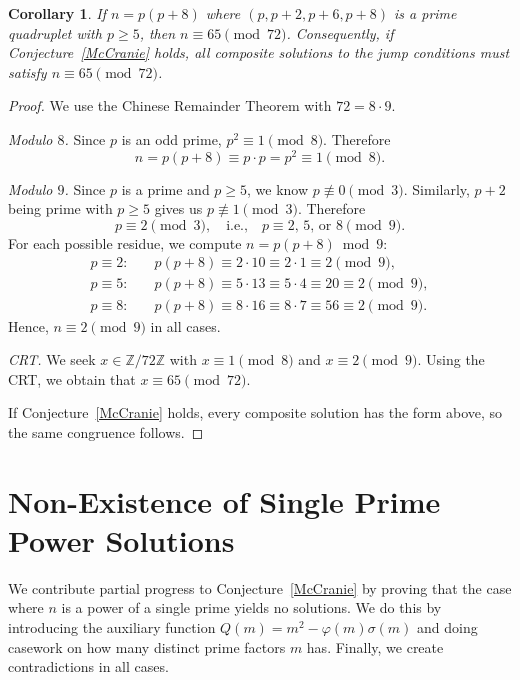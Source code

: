 \documentclass[12pt, twoside]{amsart}
\newtheorem{corollary}[theorem]{Corollary}
\theoremstyle{definition}
\begin{document}
\begin{corollary}\label{cor:residue} If $n = p(p+8)$ where $(p, p+2, p+6, p+8)$ is a prime quadruplet with $p \ge 5$, then $n \equiv 65 \pmod{72}$. Consequently, if Conjecture~\ref{McCranie} holds, all composite solutions to the jump conditions must satisfy $n \equiv 65 \pmod{72}$.
\end{corollary}

\begin{proof}
We use the Chinese Remainder Theorem with $72 = 8 \cdot 9$.

\emph{Modulo $8$.} Since $p$ is an odd prime, $p^2 \equiv 1 \pmod 8$. Therefore
\[
n = p(p+8) \equiv p \cdot p = p^2 \equiv 1 \pmod 8.
\]

\emph{Modulo $9$.} Since $p$ is a prime and $p\ge5$, we know $p \not\equiv 0 \pmod 3$. Similarly, $p+2$ being prime with $p \ge 5$ gives us $p \not\equiv 1 \pmod 3$. Therefore
\[
p \equiv 2 \pmod 3, \quad \text{i.e.,} \quad p \equiv 2,\, 5,\, \text{or } 8 \pmod 9.
\]
For each possible residue, we compute $n = p(p+8) \bmod 9$:
\begin{align*}
p \equiv 2: \quad & p(p+8) \equiv 2 \cdot 10 \equiv 2 \cdot 1 \equiv 2 \pmod 9, \\
p \equiv 5: \quad & p(p+8) \equiv 5 \cdot 13 \equiv 5 \cdot 4 \equiv 20 \equiv 2 \pmod 9, \\
p \equiv 8: \quad & p(p+8) \equiv 8 \cdot 16 \equiv 8 \cdot 7 \equiv 56 \equiv 2 \pmod 9.
\end{align*}
Hence, $n \equiv 2 \pmod 9$ in all cases.

\smallskip
\emph{CRT.} We seek $x \in \mathbb{Z}/72\mathbb{Z}$ with $x \equiv 1 \pmod 8$ and $x \equiv 2 \pmod 9$. Using the CRT, we obtain that $x\equiv65 \pmod {72}$.

If Conjecture~\ref{McCranie} holds, every composite solution has
the form above, so the same congruence follows.
\end{proof}

\section {Non-Existence of Single Prime Power Solutions}\label{sec:SinglePrimePower}

We contribute partial progress to Conjecture~\ref{McCranie} by proving that the case where $n$ is a power of a single prime yields no solutions. We do this by introducing the auxiliary function $Q(m)=m^2-\varphi(m)\sigma(m)$ and doing casework on how many distinct prime factors $m$ has. Finally, we create contradictions in all cases.
\end{document}
